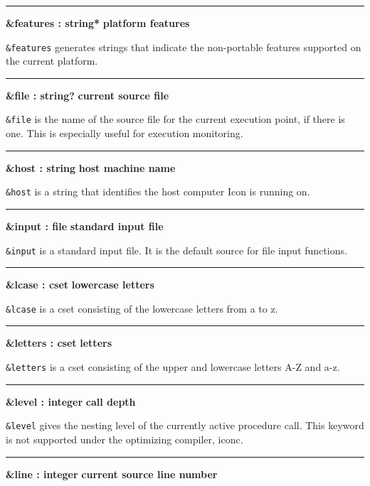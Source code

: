 \bigskip\hrule\vspace{0.1cm}
\noindent
{\bf \&features : string* } \hfill {\bf platform features}

\noindent
{}\texttt{\&features} generates strings that indicate the
non-portable features supported on the current platform.

\bigskip\hrule\vspace{0.1cm}
\noindent
{\bf \&file : string? } \hfill {\bf current source file}

\noindent
\texttt{\&file} is the name of the source file for
the current execution point, if there is one. This is especially useful
for execution monitoring.

\bigskip\hrule\vspace{0.1cm}
\noindent
{\bf \&host : string } \hfill {\bf host machine name}

\noindent
{}\texttt{\&host} is a string that
identifies the host computer Icon is running on.

\bigskip\hrule\vspace{0.1cm}
\noindent
{\bf \&input : file } \hfill {\bf standard input file}

\noindent
{}\texttt{\&input} is a standard input
file. It is the default source for file input functions.

\bigskip\hrule\vspace{0.1cm}
\noindent
{\bf \&lcase : cset } \hfill {\bf lowercase letters}

\noindent
{}\texttt{\&lcase} is a cset consisting of
the lowercase letters from a to z.

\bigskip\hrule\vspace{0.1cm}
\noindent
{\bf \&letters : cset } \hfill {\bf letters}

\noindent
{}\texttt{\&letters} is a cset consisting
of the upper and lowercase letters A-Z and a-z.

\bigskip\hrule\vspace{0.1cm}
\noindent
{\bf \&level : integer } \hfill {\bf call depth}

\noindent
{}\texttt{\&level} gives the nesting level of the
currently active procedure call. This keyword is not supported under
the optimizing compiler, iconc.

\bigskip\hrule\vspace{0.1cm}
\noindent
{\bf \&line : integer } \hfill {\bf current source line number}

